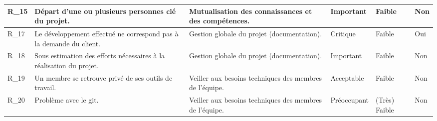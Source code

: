 \documentclass{../../res/univ-projet}
\begin{document}
\begin{flushleft}
\begin{tabular}{| p{1.4cm} | p{4cm} | p{4cm} | p{1.7cm} | p{1.6cm} | p{1.2cm} |}
  		R\_15 & Départ d'une ou plusieurs personnes clé du projet. & Mutualisation des connaissances et des compétences. & Important & Faible & \cellcolor{green} Non\\ \hline
  		R\_17 & Le développement effectué ne correspond pas à la demande du client. & Gestion globale du projet (documentation). & Critique & Faible & \cellcolor{red} Oui\\ \hline
  		R\_18 & Sous estimation des efforts nécessaires à la réalisation du projet. & Gestion globale du projet (documentation). & Important & Faible & \cellcolor{green} Non\\ \hline
  		R\_19 & Un membre se retrouve privé de ses outils de travail. & Veiller aux besoins techniques des membres de l'équipe. & Acceptable & Faible & \cellcolor{green} Non\\ \hline
  		R\_20 & Problème avec le git. & Veiller aux besoins techniques des membres de l'équipe. & Préoccupant & (Très) Faible & \cellcolor{green} Non\\ \hline
	\end{tabular}
\end{flushleft}

\end{document}
